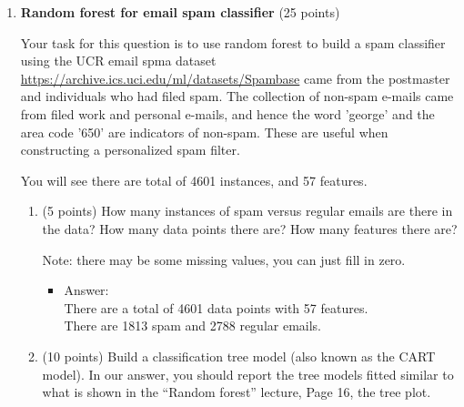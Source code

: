 \documentclass[twoside,12pt]{article}
\begin{document}
\begin{enumerate}
\clearpage

\item{\bf Random forest for email spam classifier} (25 points)

Your task for this question is to use random forest to build a spam classifier using the UCR email spma dataset \url{https://archive.ics.uci.edu/ml/datasets/Spambase} came from the postmaster and individuals who had filed spam. The collection of non-spam e-mails came from filed work and personal e-mails, and hence the word \textsf{'george'} and the area code \textsf{'650'} are indicators of non-spam. These are useful when constructing a personalized spam filter. 

You will see there are total of 4601 instances, and 57 features. 

\begin{enumerate}

\item (5 points) How many instances of spam versus regular emails are there in the data? How many data points there are? How many features there are?

Note: there may be some missing values, you can just fill in zero.

\begin{itemize}
\item Answer:\\
There are a total of 4601 data points with 57 features.\\
There are 1813 spam and 2788 regular emails.
\end{itemize}

\item (10 points) Build a classification tree model (also known as the CART model). In our answer, you should report the tree models fitted similar to what is shown in the ``Random forest'' lecture, Page 16, the tree plot.


\end{enumerate}
\end{enumerate}
\end{document}

